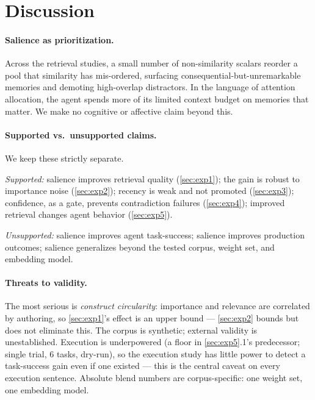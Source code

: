 \documentclass[11pt]{article}
\begin{document}
\section{Discussion}
\label{sec:discussion}

\paragraph{Salience as prioritization.} Across the retrieval studies, a small number of
non-similarity scalars reorder a pool that similarity has mis-ordered, surfacing
consequential-but-unremarkable memories and demoting high-overlap distractors. In the
language of attention allocation, the agent spends more of its limited context budget on
memories that matter. We make no cognitive or affective claim beyond this.

\paragraph{Supported vs.\ unsupported claims.} We keep these strictly separate.

\emph{Supported:} salience improves retrieval quality (\cref{sec:exp1}); the gain is robust
to importance noise (\cref{sec:exp2}); recency is weak and not promoted (\cref{sec:exp3});
confidence, as a gate, prevents contradiction failures (\cref{sec:exp4}); improved retrieval
changes agent behavior (\cref{sec:exp5}).

\emph{Unsupported:} salience improves agent task-success; salience improves production
outcomes; salience generalizes beyond the tested corpus, weight set, and embedding model.

\paragraph{Threats to validity.} The most serious is \emph{construct circularity}:
importance and relevance are correlated by authoring, so \cref{sec:exp1}'s effect is an
upper bound --- \cref{sec:exp2} bounds but does not eliminate this. The corpus is synthetic;
external validity is unestablished. Execution is underpowered (a floor in
\cref{sec:exp5}.1's predecessor; single trial, 6 tasks, dry-run), so the execution study has
little power to detect a task-success gain even if one existed --- this is the central caveat
on every execution sentence. Absolute blend numbers are corpus-specific: one weight set, one
embedding model.
\end{document}
